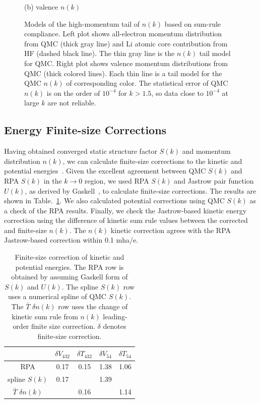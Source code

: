 \documentclass[aps,prl,superscriptaddress]{revtex4-1}
\newcommand{\midrule}{\hline}
\newcommand{\bottomrule}{\hline\hline}
\begin{document}
\begin{figure}[h]
\begin{minipage}{0.49\linewidth}
(b) valence $n(k)$
\end{minipage}
\caption{Models of the high-momentum tail of $n(k)$ based on sum-rule compliance. Left plot shows all-electron momentum distribution from QMC (thick gray line) and Li atomic core contribution from HF (dashed black line). The thin gray line is the $n(k)$ tail model for QMC. Right plot shows valence momentum distributions from QMC (thick colored lines). Each thin line is a tail model for the QMC $n(k)$ of corresponding color. The statistical error of QMC $n(k)$ is on the order of $10^{-4}$ for $k>1.5$, so data close to $10^{-4}$ at large $k$ are not reliable.}
\label{fig:qmc-tail-model}
\end{figure}

\subsection{Energy Finite-size Corrections}

Having obtained converged static structure factor $S(k)$ and momentum distribution $n(k)$, we can calculate finite-size corrections to the kinetic and potential energies~\cite{PhysRevLett.97.076404,Holzmann2016}.
Given the excellent agreement between QMC $S(k)$ and RPA $S(k)$ in the $k\rightarrow0$ region, we used RPA $S(k)$ and Jastrow pair function $U(k)$, as derived by Gaskell~\cite{Gaskell1961}, to calculate finite-size corrections. The results are shown in Table.~\ref{tab:rpa-dtdv}.
We also calculated potential corrections using QMC $S(k)$ as a check of the RPA results. Finally, we check the Jastrow-based kinetic energy correction using the difference of kinetic sum rule values between the corrected and finite-size $n(k)$. The $n(k)$ kinetic correction agrees with the RPA Jastrow-based correction within 0.1 mha/e.

\begin{table}[h]
\caption{Finite-size correction of kinetic and potential energies. The RPA row is obtained by assuming Gaskell form of $S(k)$ and $U(k)$. The spline $S(k)$ row uses a numerical spline of QMC $S(k)$. The $\bar{T}$ $\delta n(k)$ row uses the change of kinetic sum rule from $n(k)$ leading-order finite size correction. $\delta$ denotes finite-size correction. \label{tab:rpa-dtdv}}
\begin{tabular}{ccccc}
\toprule
& $\delta V_{432}$ & $\delta T_{432}$ & $\delta V_{54}$ & $\delta T_{54}$ \\
\midrule
RPA & 0.17 & 0.15 & 1.38 & 1.06 \\
spline $S(k)$ & 0.17 & & 1.39 & \\
$\bar{T}$ $\delta n(k)$ & & 0.16 & & 1.14 \\
\bottomrule
\end{tabular}
\end{table}
\end{document}
